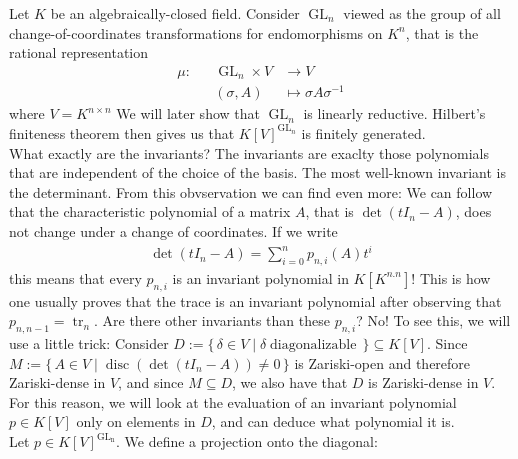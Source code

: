 \begin{dexample}
  Let $K$ be an algebraically-closed field.
  Consider $\operatorname{GL}_n$ viewed as the group of all change-of-coordinates transformations for endomorphisms on $K^n$, that is the rational representation
  \begin{equation}
    \begin{aligned}
      \mu \colon && \operatorname{GL}_n \times V  & \longrightarrow V \\
      && (\sigma,A) &\longmapsto \sigma A \sigma^{-1}
    \end{aligned}
  \end{equation}
  where $V = K^{n\times n}$
  We will later show that $\operatorname{GL}_n$ is linearly reductive.
  Hilbert's finiteness theorem then gives us that $K[V]^{\operatorname{GL}_n}$ is finitely generated.\\
  What exactly are the invariants?
  The invariants are exaclty those polynomials that are independent of the choice of the basis.
  The most well-known invariant is the determinant.
  From this obvservation we can find even more:
  We can follow that the characteristic polynomial of a matrix $A$, that is $\operatorname{det} (tI_n - A)$, does not change under a change of coordinates.
  If we write
  \begin{equation}
    \begin{aligned}
      \operatorname{det} (tI_n - A) = \sum_{i=0}^n p_{n,i} (A) t^i
    \end{aligned}
  \end{equation}
  this means that every $p_{n,i}$ is an invariant polynomial in $K[K^{n.n}]$!
  This is how one usually proves that the trace is an invariant polynomial after observing that $p_{n,n-1} = \operatorname{tr}_n$.
  Are there other invariants than these $p_{n,i}$?
  No!
  To see this, we will use a little trick:
  Consider $D := \{\, \delta \in V \mid \delta \operatorname{diagonalizable} \,\} \subseteq K[V]$.
  Since $M := \{\, A \in V \mid \operatorname{disc}(\operatorname{det}(tI_n - A)) \neq 0 \,\}$ is Zariski-open and therefore Zariski-dense in $V$, and since $M \subseteq D$, we also have that $D$ is Zariski-dense in $V$.
  For this reason, we will look at the evaluation of an invariant polynomial $p \in K[V] $ only on elements in $D$, and can deduce what polynomial it is.\\
  Let $p \in K[V]^{\operatorname{GL_n}}$.
  We define a projection onto the diagonal:

\end{dexample}
